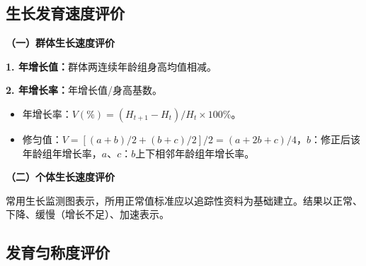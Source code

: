 \subsection{生长发育速度评价}

\begin{keybox}
\textbf{（一）群体生长速度评价}

\textbf{1. 年增长值：}群体两连续年龄组身高均值相减。

\textbf{2. 年增长率：}年增长值/身高基数。

\begin{itemize}[leftmargin=*]
    \item 年增长率：$V(\%)=(H_{t+1}-H_t)/H_t\times 100\%$。
    \item 修匀值：$V=[(a+b)/2+(b+c)/2]/2=(a+2b+c)/4$，$b$：修正后该年龄组年增长率，$a$、$c$：$b$上下相邻年龄组年增长率。
\end{itemize}

\textbf{（二）个体生长速度评价}

常用生长监测图表示，所用正常值标准应以追踪性资料为基础建立。结果以正常、下降、缓慢（增长不足）、加速表示。
\end{keybox}

\subsection{发育匀称度评价}

